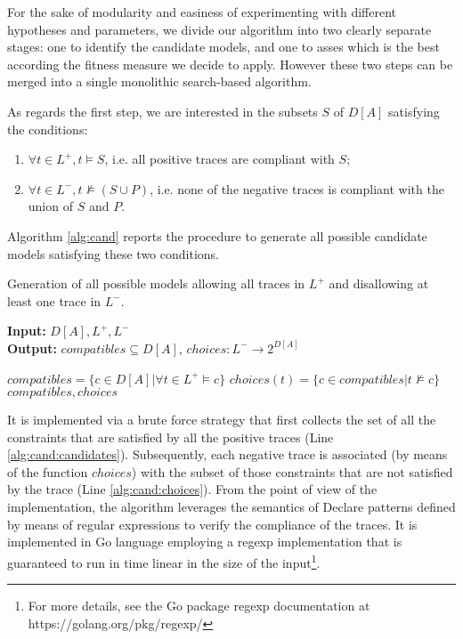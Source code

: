 For the sake of modularity and easiness of experimenting with different hypotheses and parameters, we divide our algorithm into two clearly separate stages: one to identify the candidate models, and one to asses which is the best according the fitness measure we decide to apply. However these two steps can be merged into a single monolithic search-based algorithm.


As regards the first step, we are interested in the subsets $S$ of $D[A]$ satisfying the conditions:
\begin{enumerate}
\item $\forall t \in L^+, t \models S$, i.e. all positive traces are compliant with $S$;
\item $\forall t \in L^-, t \not\models (S \cup P)$, i.e. none of the negative traces is compliant with the union of $S$ and $P$.
\end{enumerate}
%
Algorithm \ref{alg:cand} reports the procedure to generate all possible candidate models satisfying these two conditions.
%
\begin{algorithm}
    \caption{Generation of all possible models allowing all traces in $L^+$ and disallowing at least one trace in $L^-$.}
    \label{alg:cand}
    \textbf{Input:}  $D[A], L^+, L^-$\\
    \textbf{Output:} ${compatibles} \subseteq D[A]$, ${choices} : L^- \rightarrow 2^{D[A]}$
	\begin{algorithmic}[1] 
   	\State ${compatibles}= \{c \in D[A] | \forall t \in L^+ \models c\}$ \label{alg:cand:candidates}
		\State ${choices}(t) = \{c \in {compatibles} | t \not\models c\}$\label{alg:cand:choices}
	\EndFor
	\State \Return ${compatibles}, {choices}$
    \EndProcedure
    \end{algorithmic}
\end{algorithm}
%
It is implemented via a brute force strategy that first collects the set of all the constraints that are satisfied by all the positive traces (Line \ref{alg:cand:candidates}). Subsequently, each negative trace is associated (by means of the function ${choices}$) with the subset of those constraints that are not satisfied by the trace  (Line \ref{alg:cand:choices}). 
From the point of view of the implementation, the algorithm leverages the semantics of Declare patterns defined by means of regular expressions \cite{2017-DiCiccio} to verify the compliance of the traces. It is implemented in Go language employing a regexp implementation that is guaranteed to run in time linear in the size of the input\footnote{For more details, see the Go package regexp documentation at https://golang.org/pkg/regexp/}. 



